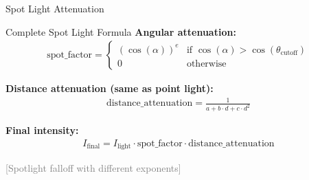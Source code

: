 \begin{frame}{Spot Light Attenuation}
  \begin{mathbox}{Complete Spot Light Formula}
    \textbf{Angular attenuation:}
    \begin{align}
      \text{spot\_factor} =
      \begin{cases}
        (\cos(\alpha))^e & \text{if } \cos(\alpha) > \cos(\theta_{\text{cutoff}}) \\
        0 & \text{otherwise}
      \end{cases}
    \end{align}

    \pause
    \textbf{Distance attenuation (same as point light):}
    \begin{align}
      \text{distance\_attenuation} = \frac{1}{a + b \cdot d + c \cdot d^2}
    \end{align}

    \pause
    \textbf{Final intensity:}
    \begin{align}
      I_{\text{final}} = I_{\text{light}} \cdot \text{spot\_factor} \cdot \text{distance\_attenuation}
    \end{align}
  \end{mathbox}

  \vspace{0.3cm}
  \pause
  \begin{center}
    \textcolor{gray}{[Spotlight falloff with different exponents]}
  \end{center}
\end{frame}

